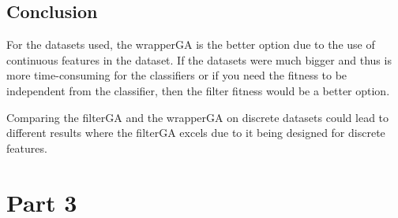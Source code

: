 \documentclass{article}
\begin{document}
\subsection*{Conclusion}
For the datasets used, the wrapperGA is the better option due to the use of continuous features in the dataset. If the datasets were much bigger and thus is more time-consuming for the classifiers or if you need the fitness to be independent from the classifier, then the filter fitness would be a better option. \par
\noindent Comparing the filterGA and the wrapperGA on discrete datasets could lead to different results where the filterGA excels due to it being designed for discrete features. \par
\section*{Part 3}
\end{document}
